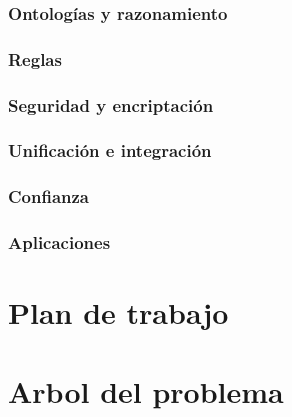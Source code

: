 \documentclass[conference,compsoc]{IEEEtran}
\begin{document}
    \subsubsection{Ontologías y razonamiento}

    \subsubsection{Reglas}

    \subsubsection{Seguridad y encriptación}

    \subsubsection{Unificación e integración}

    \subsubsection{Confianza}

    \subsubsection{Aplicaciones}

    \section{Plan de trabajo}






\appendices

\section{Arbol del problema}
\end{document}
